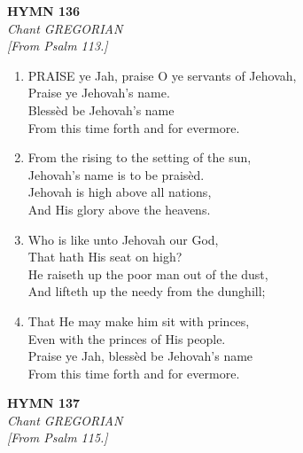 \documentclass[11pt,a4paper]{article}
\begin{document}
\newpage
\begin{center}
    {\Large \textbf{HYMN 136}}
    \\
    \textit{Chant GREGORIAN}
    \\
    \textit{\small [From Psalm 113.]}
\end{center}
\vspace{1em}

\begin{enumerate}
    \item PRAISE ye Jah, praise O ye servants of Jehovah, \\
        Praise ye Jehovah's name. \\
        Bless\`ed be Jehovah's name \\
        From this time forth and for evermore.

    \item From the rising to the setting of the sun, \\
        Jehovah's name is to be prais\`ed. \\
        Jehovah is high above all nations, \\
        And His glory above the heavens.

    \item Who is like unto Jehovah our God, \\
        That hath His seat on high? \\
        He raiseth up the poor man out of the dust, \\
        And lifteth up the needy from the dunghill;

    \item That He may make him sit with princes, \\
        Even with the princes of His people. \\
        Praise ye Jah, bless\`ed be Jehovah's name \\
        From this time forth and for evermore.

\end{enumerate}

\newpage
\begin{center}
    {\Large \textbf{HYMN 137}}
    \\
    \textit{Chant GREGORIAN}
    \\
    \textit{\small [From Psalm 115.]}
\end{center}
\vspace{1em}
\end{document}
